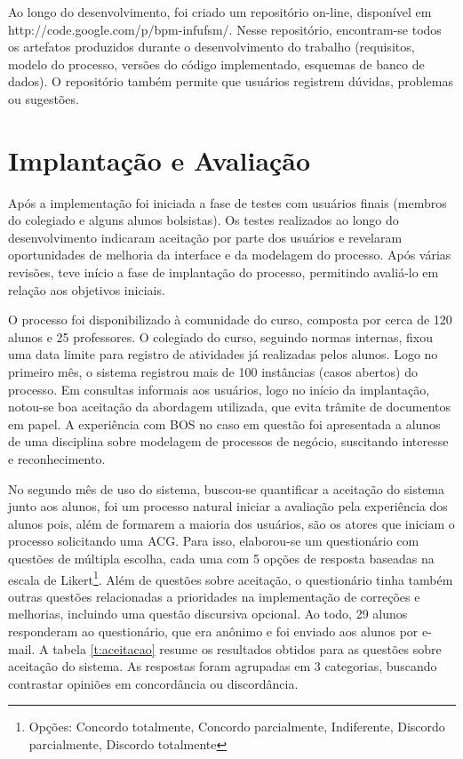 \documentclass[12pt]{article}
\begin{document}
Ao longo do desenvolvimento, foi criado um repositório on-line, disponível em http://code.google.com/p/bpm-infufsm/. Nesse repositório, encontram-se todos os artefatos produzidos durante o desenvolvimento do trabalho (requisitos, modelo do processo, versões do código implementado, esquemas de banco de dados). O repositório também permite que usuários registrem dúvidas, problemas ou sugestões.



\section{Implantação e Avaliação}

Após a implementação foi iniciada a fase de testes com usuários finais (membros do colegiado e alguns alunos bolsistas). Os testes realizados ao longo do desenvolvimento indicaram aceitação por parte dos usuários e revelaram oportunidades de melhoria da interface e da modelagem do processo. Após várias revisões, teve início a fase de implantação do processo, permitindo avaliá-lo em relação aos objetivos iniciais.

O processo foi disponibilizado à comunidade do curso, composta por cerca de 120 alunos e 25 professores. O colegiado do curso, seguindo normas internas, fixou uma data limite para registro de atividades já realizadas pelos alunos. Logo no primeiro mês, o sistema registrou mais de 100 instâncias (casos abertos) do processo. Em consultas informais aos usuários, logo no início da implantação, notou-se boa aceitação da abordagem utilizada, que evita trâmite de documentos em papel.
A experiência com BOS no caso em questão foi apresentada a alunos de uma disciplina sobre modelagem de processos de negócio, suscitando interesse e reconhecimento.

No segundo mês de uso do sistema, buscou-se quantificar a aceitação do sistema junto aos alunos, foi um processo natural iniciar a avaliação pela experiência dos alunos pois, além de formarem a maioria dos usuários, são os atores que iniciam o processo solicitando uma ACG. Para isso, elaborou-se um questionário com questões de múltipla escolha, cada uma com 5 opções de resposta baseadas na escala de Likert\footnote{Opções: Concordo totalmente, Concordo parcialmente, Indiferente, Discordo parcialmente, Discordo totalmente}. Além de questões sobre aceitação, o questionário tinha também outras questões relacionadas a prioridades na implementação de correções e melhorias, incluindo uma questão discursiva opcional. Ao todo, 29 alunos responderam ao questionário, que era anônimo e foi enviado aos alunos por e-mail. A tabela \ref{t:aceitacao} resume os resultados obtidos para as questões sobre aceitação do sistema. As respostas foram agrupadas em 3 categorias, buscando contrastar opiniões em concordância ou discordância.
\end{document}
